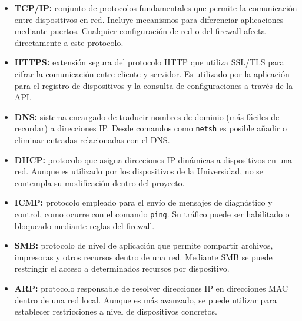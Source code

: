 \begin{itemize}
	\item \textbf{TCP/IP:} conjunto de protocolos fundamentales que permite la comunicación entre dispositivos en red.
	Incluye mecanismos para diferenciar aplicaciones mediante puertos.
	Cualquier configuración de red o del firewall afecta directamente a este protocolo\cite{wikipediaTCP}.

	\item \textbf{HTTPS:} extensión segura del protocolo HTTP que utiliza SSL/TLS para cifrar la comunicación entre
	cliente y servidor.
	Es utilizado por la aplicación para el registro de dispositivos y la consulta de configuraciones a través de la API\cite{wikipediaHTTPS}.

	\item \textbf{DNS:} sistema encargado de traducir nombres de dominio (más fáciles de recordar) a direcciones IP.
	Desde comandos como \texttt{netsh} es posible añadir o eliminar entradas relacionadas con el DNS\cite{wikipediaDNS}.

	\item \textbf{DHCP:} protocolo que asigna direcciones IP dinámicas a dispositivos en una red.
	Aunque es utilizado por los dispositivos de la Universidad, no se contempla su modificación dentro del proyecto\cite{microsoftDHCP}.

	\item \textbf{ICMP:} protocolo empleado para el envío de mensajes de diagnóstico y control, como ocurre con el
	comando \texttt{ping}.
	Su tráfico puede ser habilitado o bloqueado mediante reglas del firewall\cite{wikipediaICMP}.

	\item \textbf{SMB:} protocolo de nivel de aplicación que permite compartir archivos, impresoras y otros recursos
	dentro de una red.
	Mediante SMB se puede restringir el acceso a determinados recursos por dispositivo\cite{techtargetSMB}.

	\item \textbf{ARP:} protocolo responsable de resolver direcciones IP en direcciones MAC dentro de una red local.
	Aunque es más avanzado, se puede utilizar para establecer restricciones a nivel de dispositivos concretos\cite{wikipediaARP}.
\end{itemize}

\\
